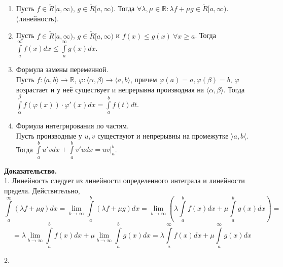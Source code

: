 \begin{enumerate}

\item Пусть $f\in \tilde R[a,\infty)$, $g\in \tilde R[a,\infty)$.
Тогда  
$\forall \lambda,\mu\in \mathbb{R}:\lambda f+\mu g\in \tilde R[a,\infty)$.
(линейность).

\item Пусть $f\in \tilde R[a,\infty)$,  $g\in \tilde R[a,\infty)$ и
    $f(x)\leqslant g(x)~\forall x\geqslant a$. Тогда
    $\int\limits_{a}^{\infty}f(x)dx\leqslant \int\limits_{a}^{\infty}g(x)dx$.

\item Формула замены переменной.\\
    Пусть $f\colon\langle a,b \rangle\to \mathbb{R}$, 
    $\varphi\colon\langle \alpha,\beta\rangle\to\langle a,b\rangle$,
    причем $\varphi(a)=a,\varphi(\beta)=b$, $\varphi$ возрастает и у неё 
    существует и непрерывна производная на $\langle\alpha,\beta\rangle$.
    Тогда $\int\limits_{\alpha}^{\beta}f(\varphi(x))\cdot \varphi'(x)dx=
    \int\limits_{a}^{b} f(t)dt$.


\item Формула интегрирования по частям.\\
    Пусть производные у $u,v$ существуют и непрерывны на промежутке  
    $\rangle a,b\langle$.
    Тогда  $ \int\limits_{a}^{b}u'vdx+\int\limits_{a}^{b}v'udx=uv\Big|^b_a$.
\end{enumerate}
\textbf{Доказательство.}\\
1. Линейность следует из линейности определенного интеграла и линейности
предела. Действительно,
$$\int\limits_{a}^{\infty}(\lambda f+\mu g)dx = 
\lim\limits_{b \to \infty} \int\limits_{a}^{b} (\lambda f+\mu g)dx = 
\lim\limits_{b \to \infty} \left(\lambda \int\limits_{a}^{b}f(x)dx + \mu
\int\limits_{a}^{b} g(x)dx\right) =
$$ 
$$ = \lambda \lim\limits_{b \to \infty} \int\limits_{a}^{b} f(x)dx + 
\mu \lim\limits_{b \to \infty} \int\limits_{a}^{b} g(x)dx = 
\lambda \int\limits_{a}^{\infty}f(x) dx + \mu \int\limits_{a}^{\infty}g(x)dx
$$

2. 

 

